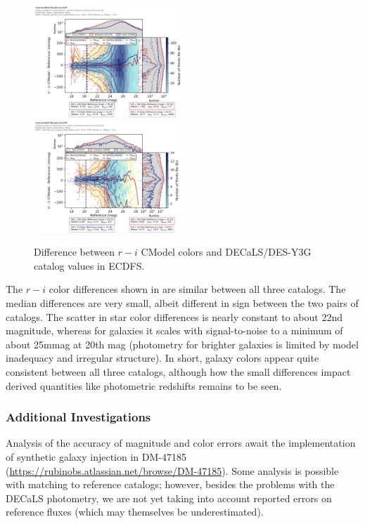 \begin{figure}
  \includegraphics[width=0.5\textwidth]{galaxy_photometry/cdfs_g_vs_rmi_DECaLS.png}
  \includegraphics[width=0.5\textwidth]{galaxy_photometry/cdfs_g_vs_rmi_desy3g.png}
\caption{Difference between $r-i$ CModel colors and DECaLS/DES-Y3G catalog values in ECDFS.}
  \label{fig:cdfs_rmi_vs_des}
\end{figure}

The $r-i$ color differences shown in  are similar between all three catalogs.
The median differences are very small, albeit different in sign between the two pairs of catalogs.
The scatter in star color differences is nearly constant to about 22nd magnitude, whereas for galaxies it scales with signal-to-noise to a minimum of about 25mmag at 20th mag (photometry for brighter galaxies is limited by model inadequacy and irregular structure).
In short, galaxy colors appear quite consistent between all three catalogs, although how the small differences impact derived quantities like photometric redshifts remains to be seen.

\subsubsection{Additional Investigations}
\label{subsec:galaxy_photometry_additional}

Analysis of the accuracy of magnitude and color errors await the implementation of synthetic galaxy injection in DM-47185 (\url{https://rubinobs.atlassian.net/browse/DM-47185}).
Some analysis is possible with matching to reference catalogs; however, besides the problems with the DECaLS photometry, we are not yet taking into account reported errors on reference fluxes (which may themselves be underestimated).

